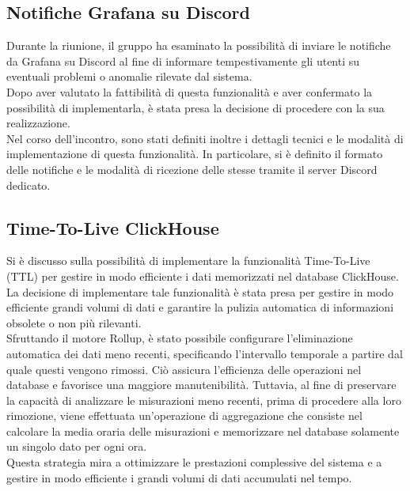 \documentclass{article}
\begin{document}
    \subsection{Notifiche Grafana su Discord}
    Durante la riunione, il gruppo ha esaminato la possibilità di inviare le notifiche da Grafana su Discord al fine di informare tempestivamente gli utenti su eventuali problemi o anomalie rilevate dal sistema. \\
    Dopo aver valutato la fattibilità di questa funzionalità e aver confermato la possibilità di implementarla, è stata presa la decisione di procedere con la sua realizzazione.\\
    Nel corso dell'incontro, sono stati definiti inoltre i dettagli tecnici e le modalità di implementazione di questa funzionalità. In particolare, si è definito il formato delle notifiche e le modalità di ricezione delle stesse tramite il server Discord dedicato.

    \subsection{Time-To-Live ClickHouse}
    Si è discusso sulla possibilità di implementare la funzionalità Time-To-Live (TTL) per gestire in modo efficiente i dati memorizzati nel database ClickHouse.\\
    La decisione di implementare tale funzionalità è stata presa per gestire in modo efficiente grandi volumi di dati e garantire la pulizia automatica di informazioni obsolete o non più rilevanti. \\
    Sfruttando il motore Rollup, è stato possibile configurare l'eliminazione automatica dei dati meno recenti, specificando l'intervallo temporale a partire dal quale questi vengono rimossi. Ciò assicura l'efficienza delle operazioni nel database e favorisce una maggiore manutenibilità. Tuttavia, al fine di preservare la capacità di analizzare le misurazioni meno recenti, prima di procedere alla loro rimozione, viene effettuata un'operazione di aggregazione che consiste nel calcolare la media oraria delle misurazioni e memorizzare nel database solamente un singolo dato per ogni ora.\\
    Questa strategia mira a ottimizzare le prestazioni complessive del sistema e a gestire in modo efficiente i grandi volumi di dati accumulati nel tempo.
\end{document}
